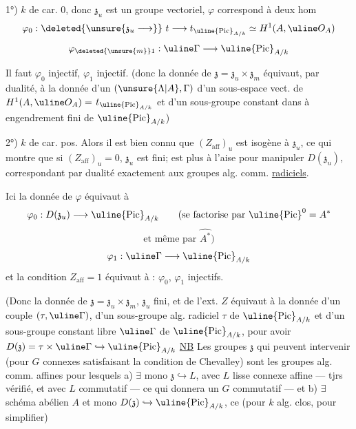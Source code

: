 1°) $k$ de car. 0, donc $\mathfrak z_u$ est un groupe vectoriel,  $\varphi$
correspond à deux hom
\[
\varphi_0:\deleted{\unsure{\mathfrak z_u\longrightarrow}}\ t\longrightarrow
 t_{\uline{\operatorname{Pic}}_{A/k}}\simeq H^1(A,\uline O_A)
\]
\[
\varphi_{\deleted{\unsure{m}}1}:\uline\Gamma\longrightarrow\uline{\operatorname{Pic}}_{A/k}
\]

Il faut $\varphi_0$ injectif, $\varphi_1$ injectif. (donc la donnée de
$\mathfrak z=\mathfrak z_u\times\mathfrak z_m$  équivaut, par dualité, à la donnée d'un 
 $(\unsure{\Lambda|A},\Gamma)$ d'un  sous-espace vect. de $H^1(A,\uline O_A)=$
$t_{\uline{\operatorname{Pic}}_{A/k}}$ et d'un sous-groupe constant dans 
 à engendrement fini de $\uline{\operatorname{Pic}}_{A/k}$)

2°) $k$ de car. pos. Alors  il est bien connu que
$(Z_{\mathrm{aff}})_u$  est isogène à $\mathfrak z_u$, ce qui montre que si
$(Z_{\mathrm{aff}})_u=0$, $\mathfrak z_u$ est fini;  est plus à l'aise pour
manipuler $D(\mathfrak z_u)$, 
correspondant par dualité exactement aux groupes alg. comm. \uline{radiciels}.

Ici la donnée de $\varphi$ équivaut à
\[
\varphi_0:D(\mathfrak z_u)\longrightarrow\uline{\operatorname{Pic}}_{A/k}
\qquad\text{(se factorise par $\uline{\operatorname{Pic}}^0=A^*$}
\]
\[\text{et même par $\widehat{A^*}$)}\]
\[
\varphi_1:\uline\Gamma\longrightarrow\uline{\operatorname{Pic}}_{A/k}
\]
et la condition $Z_{\mathrm{aff}}=1$ équivaut à : $\varphi_0$, $\varphi_1$ injectifs.

(Donc la donnée de $\mathfrak z=\mathfrak z_u\times\mathfrak z_m$, $\mathfrak z_u$ fini, et de l'ext. $Z$ équivaut
à la donnée d'un couple $(\tau,\uline\Gamma)$, d'un sous-groupe alg.
radiciel $\tau$ de $\uline{\operatorname{Pic}}_{A/k}$ et d'un sous-groupe constant libre
$\uline\Gamma$ de $\uline{\operatorname{Pic}}_{A/k}$, pour avoir $D(\mathfrak z)=\tau\times\uline\Gamma\hookrightarrow\uline{\operatorname{Pic}}_{A/k}$
\uline{NB} Les groupes $\mathfrak z$ qui peuvent intervenir (pour $G$ connexes
satisfaisant la condition de Chevalley) sont  les groupes
alg. comm. affines pour lesquels a) $\exists$ mono  $\mathfrak z\hookrightarrow L$,
avec $L$ lisse connexe affine --- tjrs vérifié, et  avec
$L$ commutatif --- ce qui donnera un $G$ commutatif ---
et b) $\exists$ schéma abélien $A$ et mono $D(\mathfrak z)\hookrightarrow\uline{\operatorname{Pic}}_{A/k}$, ce
  (pour $k$ alg. clos, pour simplifier)

